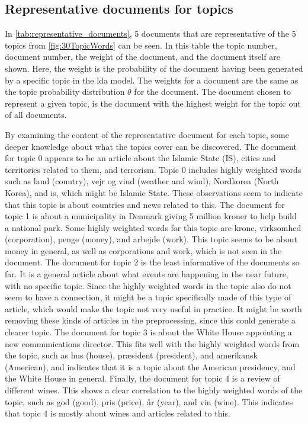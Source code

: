 \subsection{Representative documents for topics}
In \autoref{tab:representative_documents}, 5 documents that are representative of the 5 topics from \autoref{fig:30TopicWords} can be seen.
In this table the topic number, document number, the weight of the document, and the document itself are shown.
Here, the weight is the probability of the document having been generated by a specific topic in the \gls{lda} model.
The weights for a document are the same as the topic probability distribution $\theta$ for the document.
The document chosen to represent a given topic, is the document with the highest weight for the topic out of all documents.

By examining the content of the representative document for each topic, some deeper knowledge about what the topics cover can be discovered.
The document for topic 0 appears to be an article about the Islamic State (IS), cities and territories related to them, and terrorism.
Topic 0 includes highly weighted words such as land (country), vejr og vind (weather and wind), Nordkorea (North Korea), and is, which might be Islamic State.
These observations seem to indicate that this topic is about countries and news related to this.
The document for topic 1 is about a municipality in Denmark giving 5 million kroner to help build a national park.
Some highly weighted words for this topic are krone, virksomhed (corporation), penge (money), and arbejde (work).
This topic seems to be about money in general, as well as corporations and work, which is not seen in the document.
The document for topic 2 is the least informative of the documents so far.
It is a general article about what events are happening in the near future, with no specific topic.
Since the highly weighted words in the topic also do not seem to have a connection, it might be a topic specifically made of this type of article, which would make the topic not very useful in practice.
It might be worth removing these kinds of articles in the preprocessing, since this could generate a clearer topic.
The document for topic 3 is about the White House appointing a new communications director.
This fits well with the highly weighted words from the topic, such as hus (house), præsident (president), and amerikansk (American), and indicates that it is a topic about the American presidency, and the White House in general.
Finally, the document for topic 4 is a review of different wines.
This shows a clear correlation to the highly weighted words of the topic, such as god (good), pris (price), år (year), and vin (wine).
This indicates that topic 4 is mostly about wines and articles related to this.

